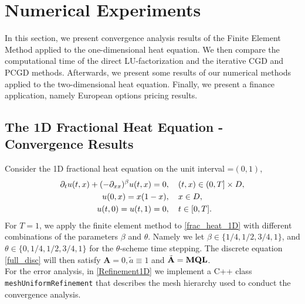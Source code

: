 \section{Numerical Experiments}
In this section, we present convergence analysis results of the Finite Element Method applied to the one-dimensional heat equation. We then compare the computational time of the direct LU-factorization and the iterative CGD and PCGD methods. Afterwards, we present some results of our numerical methods applied to the two-dimensional heat equation. Finally, we present a finance application, namely European options pricing results. 
\subsection{The 1D Fractional Heat Equation - Convergence Results} 
Consider the 1D fractional heat equation on the unit interval \truncdom=$(0,1)$,
\begin{equation} \label{frac_heat_1D}
\begin{split} %
\partial_tu(t,x) + (-\partial_{xx})^{\beta} u(t,x) = 0&, \quad  (t,x)\in(0,T]\times\truncdom, \\
u(0,x) = x(1-x)&, \quad x\in \truncdom, \\ 
u(t,0) = u(t,1) = 0&, \quad t \in [0,T].
\end{split}
\end{equation}
For $T=1$, we apply the finite element method to \eqref{frac_heat_1D} with different combinations of the parameters $\beta$ and $\theta$. Namely we let $\beta\in\{1/4, 1/2, 3/4, 1\}$, and $\theta \in \{0,1/4,1/2,3/4,1\}$ for the $\theta$-scheme time stepping. The discrete equation \eqref{full_disc} will then satisfy $\mathbf{A} =0, \tilde{a}\equiv1$ and $\tilde{\mathbf{A}} = \mathbf{M}\mathbf{Q}\mathbf{L}$. \\
\newline
For the error analysis, in \eqref{Refinement1D} we implement a C++ class \lstinline{meshUniformRefinement} that describes the mesh hierarchy used to conduct the convergence analysis. 
